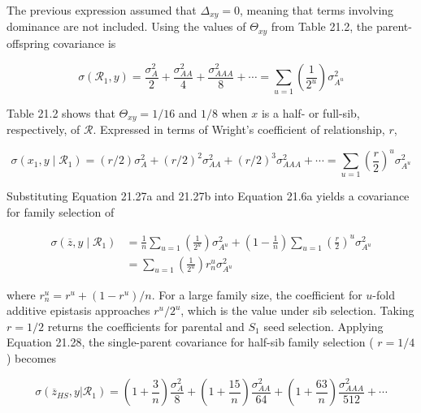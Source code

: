 \documentclass{article}
\begin{document}
The previous expression assumed that  $ \Delta_{xy} = 0 $, meaning that terms involving dominance are not included. Using the values of  $ \Theta_{xy} $ from Table 21.2, the parent-offspring covariance is

\begin{equation}
\sigma(\mathcal{R}_{1},y)=\frac{\sigma_{A}^{2}}{2}+\frac{\sigma_{A A}^{2}}{4}+\frac{\sigma_{A A A}^{2}}{8}+\cdots=\sum_{u=1}\left(\frac{1}{2^{u}}\right)\sigma_{A^{u}}^{2}
\tag{21.27a}
\label{eq:21_27a}
\end{equation}

Table 21.2 shows that  $ \Theta_{xy} = 1/16 $ and  $ 1/8 $ when  $ x $ is a half- or full-sib, respectively, of  $ \mathcal{R} $. Expressed in terms of Wright's coefficient of relationship,  $ r $,

\begin{equation}
\sigma(x_{1},y\mid\mathcal{R}_{1})=(r/2)\sigma_{A}^{2}+(r/2)^{2}\sigma_{A A}^{2}+(r/2)^{3}\sigma_{A A A}^{2}+\cdots=\sum_{u=1}\left(\frac{r}{2}\right)^{u}\sigma_{A^{u}}^{2}
\tag{21.27b}
\label{eq:21_27b}
\end{equation}

Substituting Equation 21.27a and 21.27b into Equation 21.6a yields a covariance for family selection of

\begin{equation}
\begin{align*}\sigma(\overline{z},y\mid\mathcal{R}_{1})&=\frac{1}{n}\sum_{u=1}\left(\frac{1}{2^{u}}\right)\sigma_{A^{u}}^{2}+\left(1-\frac{1}{n}\right)\sum_{u=1}\left(\frac{r}{2}\right)^{u}\sigma_{A^{u}}^{2}\\&=\sum_{u=1}\left(\frac{1}{2^{u}}\right)r_{n}^{u}\sigma_{A^{u}}^{2}\end{align*}
\tag{21.28}
\label{eq:21_28}
\end{equation}

where  $ r_n^u = r^u + (1 - r^u)/n $. For a large family size, the coefficient for  $ u $-fold additive epistasis approaches  $ r^u/2^u $, which is the value under sib selection. Taking  $ r = 1/2 $ returns the coefficients for parental and  $ S_1 $ seed selection. Applying Equation 21.28, the single-parent covariance for half-sib family selection ( $ r = 1/4 $) becomes

\begin{equation}
\sigma(\overline{z}_{H S},y\left|\mathcal{R}_{1}\right.)=\left(1+\frac{3}{n}\right)\frac{\sigma_{A}^{2}}{8}+\left(1+\frac{15}{n}\right)\frac{\sigma_{A A}^{2}}{64}+\left(1+\frac{63}{n}\right)\frac{\sigma_{A A A}^{2}}{512}+\cdots
\tag{21.29a}
\label{eq:21_29a}
\end{equation}
\end{document}
